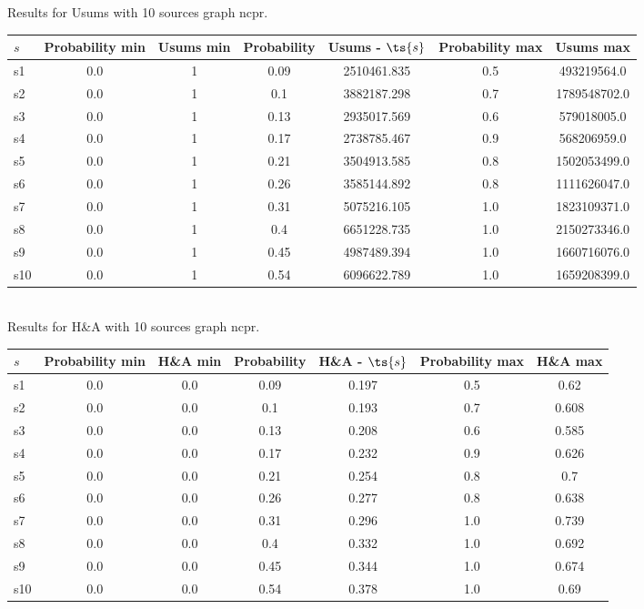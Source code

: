 \documentclass{article}
\begin{document}
\noindent Results for Usums with 10 sources graph ncpr.

\noindent\begin{tabular}{|l|c|c|c|c|c|c|}
\hline
$s$& Probability min & Usums min & Probability & Usums - $\ts{s}$ & Probability max & Usums max\\
\hline
s1 &0.0 & 1 & 0.09 & 2510461.835 & 0.5 & 493219564.0\\
\hline
s2 &0.0 & 1 & 0.1 & 3882187.298 & 0.7 & 1789548702.0\\
\hline
s3 &0.0 & 1 & 0.13 & 2935017.569 & 0.6 & 579018005.0\\
\hline
s4 &0.0 & 1 & 0.17 & 2738785.467 & 0.9 & 568206959.0\\
\hline
s5 &0.0 & 1 & 0.21 & 3504913.585 & 0.8 & 1502053499.0\\
\hline
s6 &0.0 & 1 & 0.26 & 3585144.892 & 0.8 & 1111626047.0\\
\hline
s7 &0.0 & 1 & 0.31 & 5075216.105 & 1.0 & 1823109371.0\\
\hline
s8 &0.0 & 1 & 0.4 & 6651228.735 & 1.0 & 2150273346.0\\
\hline
s9 &0.0 & 1 & 0.45 & 4987489.394 & 1.0 & 1660716076.0\\
\hline
s10 &0.0 & 1 & 0.54 & 6096622.789 & 1.0 & 1659208399.0\\
\hline
\end{tabular}\\

\noindent Results for H\&A with 10 sources graph ncpr.

\noindent\begin{tabular}{|l|c|c|c|c|c|c|}
\hline
$s$& Probability min & H\&A min & Probability & H\&A - $\ts{s}$ & Probability max & H\&A max\\
\hline
s1 &0.0 & 0.0 & 0.09 & 0.197 & 0.5 & 0.62\\
\hline
s2 &0.0 & 0.0 & 0.1 & 0.193 & 0.7 & 0.608\\
\hline
s3 &0.0 & 0.0 & 0.13 & 0.208 & 0.6 & 0.585\\
\hline
s4 &0.0 & 0.0 & 0.17 & 0.232 & 0.9 & 0.626\\
\hline
s5 &0.0 & 0.0 & 0.21 & 0.254 & 0.8 & 0.7\\
\hline
s6 &0.0 & 0.0 & 0.26 & 0.277 & 0.8 & 0.638\\
\hline
s7 &0.0 & 0.0 & 0.31 & 0.296 & 1.0 & 0.739\\
\hline
s8 &0.0 & 0.0 & 0.4 & 0.332 & 1.0 & 0.692\\
\hline
s9 &0.0 & 0.0 & 0.45 & 0.344 & 1.0 & 0.674\\
\hline
s10 &0.0 & 0.0 & 0.54 & 0.378 & 1.0 & 0.69\\
\hline
\end{tabular}\\
\end{document}
